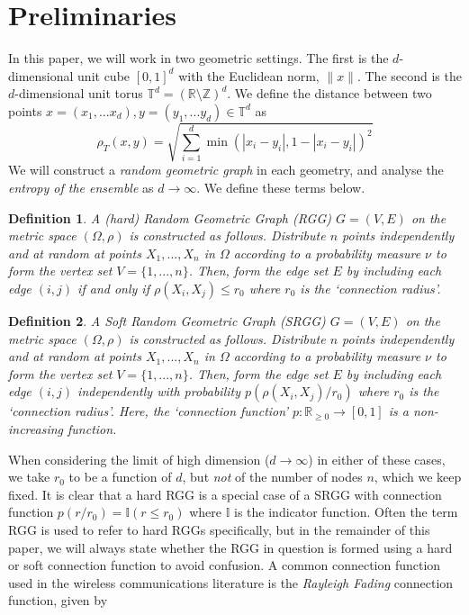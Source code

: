 \documentclass{article}
\newtheorem{definition}{Definition}
\newcommand{\tti}{\rightarrow\infty}
\begin{document}
\section{Preliminaries}
In this paper, we will work in two geometric settings. The first is the $d$-dimensional unit cube $[0,1]^d$ with the Euclidean norm, $\|x\|$. The second is the $d$-dimensional unit torus $\mathbb{T}^d=(\mathbb{R}\setminus\mathbb{Z})^d$. We define the distance between two points $x = (x_1,...x_d), y=(y_1,...y_d) \in \mathbb{T}^d$ as 
\begin{equation}
    \label{eq:torus_metric}
    \rho_T(x,y) = \sqrt{\sum_{i=1}^d \min(|x_i-y_i|, 1-|x_i-y_i|)^2}
\end{equation}  
We will construct a \textit{random geometric graph} in each geometry, and analyse the \textit{entropy of the ensemble} as $d\tti$. We define these terms below.
\begin{definition}
    A (hard) Random Geometric Graph (RGG) $G = (V,E)$ on the metric space $(\Omega, \rho)$ is constructed as follows. Distribute $n$ points independently and at random at points $X_1,...,X_n$ in $\Omega$ according to a probability measure $\nu$ to form the vertex set $V = \{1,...,n\}$. Then, form the edge set $E$ by including each edge $(i,j)$ if and only if $\rho(X_i, X_j) \leq r_0$ where $r_0$ is the `connection radius'.
\end{definition}
\begin{definition}
    A Soft Random Geometric Graph (SRGG) $G = (V,E)$ on the metric space $(\Omega, \rho)$ is constructed as follows. Distribute $n$ points independently and at random at points $X_1,...,X_n$ in $\Omega$ according to a probability measure $\nu$ to form the vertex set $V = \{1,...,n\}$. Then, form the edge set $E$ by including each edge $(i,j)$ independently with probability $p(\rho(X_i, X_j)/r_0)$ where $r_0$ is the `connection radius'. Here, the `connection function' $p : \mathbb{R}_{\geq 0} \rightarrow [0,1]$ is a non-increasing function.
\end{definition}
When considering the limit of high dimension ($d\tti$) in either of these cases, we take $r_0$ to be a function of $d$, but \textit{not} of the number of nodes $n$, which we keep fixed. It is clear that a hard RGG is a special case of a SRGG with connection function $p(r/r_0) = \mathbb{I}(r\leq r_0)$ where $\mathbb{I}$ is the indicator function. Often the term RGG is used to refer to hard RGGs specifically, but in the remainder of this paper, we will always state whether the RGG in question is formed using a hard or soft connection function to avoid confusion. A common connection function used in the wireless communications literature is the \textit{Rayleigh Fading} connection function, given by \cite{dettmann2016random}
\end{document}
